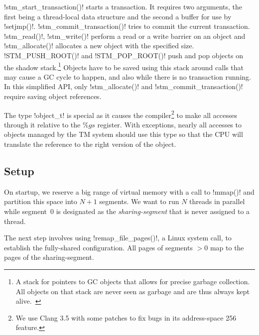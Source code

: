 \documentclass{sigplanconf}
\makeatletter
\renewcommand\lstinline[1][]{%
  \Collectverb{\@@myverb}%
}
\def\@@myverb#1{%
    \begingroup
    \fboxsep=0.2em
    \colorbox{verylightgray}{\oldlstinline|#1|}%
    \endgroup
}
\makeatother
\begin{document}
\lstinline!stm_start_transaction()!  starts a transaction. It requires
two arguments, the first being a thread-local data structure and the
second a buffer for use by \lstinline!setjmp()!.
\lstinline!stm_commit_transaction()!  tries to commit the current
transaction. \lstinline!stm_read()!, \lstinline!stm_write()!  perform
a read or a write barrier on an object and \lstinline!stm_allocate()!
allocates a new object with the specified size.
 \lstinline!STM_PUSH_ROOT()!  and \lstinline!STM_POP_ROOT()!  push
and pop objects on the shadow stack.\footnote{A stack for pointers to
  GC objects that allows for precise garbage collection. All objects
  on that stack are never seen as garbage and are thus always kept
  alive.~\cite{fergus02}}  Objects have to be saved using this stack around calls
that may cause a GC cycle to happen, and also while there is no
transaction running. In this simplified API, only
\lstinline!stm_allocate()!  and \lstinline!stm_commit_transaction()!
require saving object references.

The type \lstinline!object_t!  is special as it causes the
compiler\footnote{We use Clang 3.5 with some patches to fix bugs in its address-space
 256 feature.} to make all accesses through it relative to the $\%gs$
register.  With exceptions, nearly all accesses to objects managed by
the TM system should use this type so that the CPU will translate the
reference to the right version of the object.


\subsection{Setup\label{sub:Setup}}

On startup, we reserve a big range of virtual memory with a call to
\lstinline!mmap()! and partition this space into $N+1$ segments. We
want to run $N$ threads in parallel while segment~0 is designated as
the \emph{sharing-segment} that is never assigned to a thread.

The next step involves using \lstinline!remap_file_pages()!, a Linux
system call, to establish the fully-shared configuration.  All pages
of segments $>0$ map to the pages of the sharing-segment.
\end{document}
